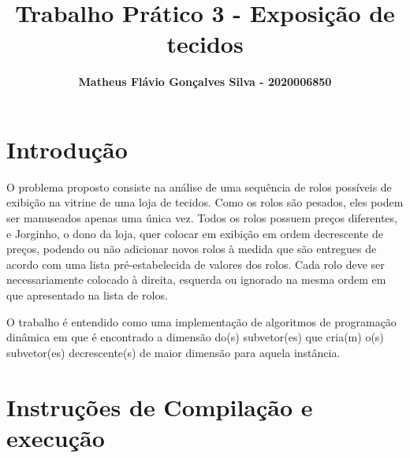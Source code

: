 \documentclass[12pt]{article}
\title{\textbf{Trabalho Prático 3 - Exposição de tecidos}}
\author{\textbf{Matheus Flávio Gonçalves Silva - 2020006850}}
\date{\parbox{\linewidth}{\centering%
    Universidade Federal de Minas Gerais (UFMG)\endgraf
    Belo Horizonte - MG - Brasil\endgraf\bigskip
    \href{mailto:email@ufmg.br}{matheusfgs@ufmg.br}}}
\begin{document}
\maketitle

\section{Introdução}
\par O problema proposto consiste na análise de uma sequência de rolos possíveis de exibição na vitrine de uma loja de tecidos. Como os rolos são pesados, eles podem ser manuseados apenas uma única vez. Todos os rolos possuem preços diferentes, e Jorginho, o dono da loja, quer colocar em exibição em ordem decrescente de preços, podendo ou não adicionar novos rolos à medida que são entregues de acordo com uma lista pré-estabelecida de valores dos rolos. Cada rolo deve ser necessariamente colocado à direita, esquerda ou ignorado na mesma ordem em que apresentado na lista de rolos.
\par O trabalho é entendido como uma implementação de algoritmos de programação dinâmica em que é encontrado a dimensão do(s) subvetor(es) que cria(m) o(s) subvetor(es) decrescente(s) de maior dimensão para aquela instância.
    
\section{Instruções de Compilação e execução}
\end{document}
